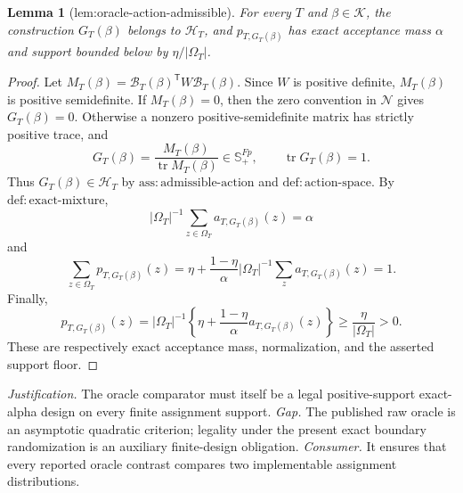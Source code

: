 \documentclass{article}
\newtheorem{lemma}{Lemma}
\begin{document}
\begin{lemma}[lem:oracle-action-admissible]\label{lem:oracle-action-admissible}
For every \(T\) and \(\beta\in\mathcal K\), the construction \(G_T(\beta)\) belongs to \(\mathcal H_T\), and \(p_{T,G_T(\beta)}\) has exact acceptance mass \(\alpha\) and support bounded below by \(\eta/|\Omega_T|\).
\end{lemma}
\begin{proof}
Let \(M_T(\beta)=\mathcal B_T(\beta)^{\mathsf T}W\mathcal B_T(\beta)\).  Since \(W\) is positive definite, \(M_T(\beta)\) is positive semidefinite.  If \(M_T(\beta)=0\), then the zero convention in \(\mathcal N\) gives \(G_T(\beta)=0\).  Otherwise a nonzero positive-semidefinite matrix has strictly positive trace, and
\[
 G_T(\beta)=\frac{M_T(\beta)}{\operatorname{tr}M_T(\beta)}
 \in\mathbb S_+^{Fp},
 \qquad \operatorname{tr}G_T(\beta)=1.
\]
Thus \(G_T(\beta)\in\mathcal H_T\) by \(\mathrm{ass{:}admissible\text{-}action}\) and \(\mathrm{def{:}action\text{-}space}\).  By \(\mathrm{def{:}exact\text{-}mixture}\),
\[
 |\Omega_T|^{-1}\sum_{z\in\Omega_T}a_{T,G_T(\beta)}(z)=\alpha
\]
and
\[
 \sum_{z\in\Omega_T}p_{T,G_T(\beta)}(z)
 =\eta+\frac{1-\eta}{\alpha}|\Omega_T|^{-1}\sum_z a_{T,G_T(\beta)}(z)=1.
\]
Finally,
\[
 p_{T,G_T(\beta)}(z)
 =|\Omega_T|^{-1}\left\{\eta+\frac{1-\eta}{\alpha}a_{T,G_T(\beta)}(z)\right\}
 \geq \frac{\eta}{|\Omega_T|}>0.
\]
These are respectively exact acceptance mass, normalization, and the asserted support floor.
\end{proof}
\par\smallskip\noindent \textit{Justification.} The oracle comparator must itself be a legal positive-support exact-alpha design on every finite assignment support. \textit{Gap.} The published raw oracle is an asymptotic quadratic criterion; legality under the present exact boundary randomization is an auxiliary finite-design obligation. \textit{Consumer.} It ensures that every reported oracle contrast compares two implementable assignment distributions.
\end{document}

